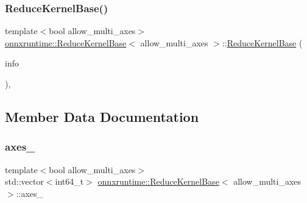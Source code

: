\subsubsection{\texorpdfstring{Reduce\+Kernel\+Base()}{ReduceKernelBase()}}
{\footnotesize\ttfamily template$<$bool allow\+\_\+multi\+\_\+axes$>$ \\
\mbox{\hyperlink{classonnxruntime_1_1ReduceKernelBase}{onnxruntime\+::\+Reduce\+Kernel\+Base}}$<$ allow\+\_\+multi\+\_\+axes $>$\+::\mbox{\hyperlink{classonnxruntime_1_1ReduceKernelBase}{Reduce\+Kernel\+Base}} (\begin{DoxyParamCaption}\item[{const \mbox{\hyperlink{classonnxruntime_1_1OpKernelInfo}{Op\+Kernel\+Info}} \&}]{info }\end{DoxyParamCaption})\hspace{0.3cm}{\ttfamily [inline]}, {\ttfamily [protected]}}



\subsection{Member Data Documentation}
\mbox{\label{classonnxruntime_1_1ReduceKernelBase_a003cd886af34dd5ecb6bc5244e8c9ff6}} 
\subsubsection{\texorpdfstring{axes\+\_\+}{axes\_}}
{\footnotesize\ttfamily template$<$bool allow\+\_\+multi\+\_\+axes$>$ \\
std\+::vector$<$int64\+\_\+t$>$ \mbox{\hyperlink{classonnxruntime_1_1ReduceKernelBase}{onnxruntime\+::\+Reduce\+Kernel\+Base}}$<$ allow\+\_\+multi\+\_\+axes $>$\+::axes\+\_\+\hspace{0.3cm}{\ttfamily [protected]}}

\mbox{\label{classonnxruntime_1_1ReduceKernelBase_aa8eea3f720a6238356a38e487a0365af}} 
